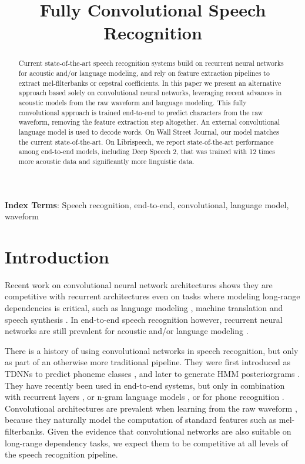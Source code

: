 \documentclass[a4paper]{article}
\title{Fully Convolutional Speech Recognition}
\begin{document}
\maketitle
\begin{abstract}

Current state-of-the-art speech recognition systems build on recurrent
neural networks for acoustic and/or language modeling, and rely on
feature extraction pipelines to extract mel-filterbanks or cepstral
coefficients. In this paper we present an alternative approach based
solely on convolutional neural networks, leveraging recent advances in
acoustic models from the raw waveform and language modeling. This
fully convolutional approach is trained end-to-end to predict
characters from the raw waveform, removing the feature extraction step
altogether. An external convolutional language model is used to decode words. On Wall Street Journal, our model matches the current state-of-the-art. On Librispeech, we report state-of-the-art performance among end-to-end models, including Deep Speech 2, that was trained with 12 times more acoustic data and significantly more linguistic data.

\end{abstract}
\noindent\textbf{Index Terms}: Speech recognition, end-to-end, convolutional, language model, waveform

\section{Introduction}
\label{sec:intro}
Recent work on convolutional neural network architectures shows they are competitive with recurrent architectures even on tasks where modeling long-range dependencies is critical, such as language modeling \cite{glu}, machine translation \cite{fairseq,fairseq_translation} and speech synthesis \cite{wavenet}. In end-to-end speech recognition however, recurrent neural networks are still prevalent for acoustic and/or language modeling \cite{CTC,RNNLM,deepspeech2,seq2seqspeech, improvedzeyer}.

There is a history of using convolutional networks in speech recognition, but only as part of an otherwise more traditional pipeline. They were first introduced as TDNNs to predict phoneme classes \cite{tdnn}, and later to generate HMM posteriorgrams \cite{cnn_abdelhamid}. They have recently been used in end-to-end systems, but only in combination with recurrent layers \cite{deepspeech2}, or n-gram language models  \cite{wav2letter2}, or for phone recognition \cite{zhang_towards, tdfbanks1}. Convolutional architectures are prevalent when learning from the raw waveform  \cite{palaz2015convolutional,hoshen2015speech,sainath2015learning,tdfbanks1,tdfbanks2}, because they naturally model the computation of standard features such as mel-filterbanks. Given the evidence that convolutional networks are also suitable on long-range dependency tasks,
we expect them to be competitive at all levels of the speech recognition pipeline.
\end{document}

